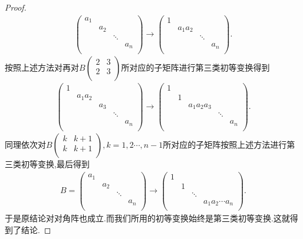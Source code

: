 \documentclass[lang=cn,newtx,10pt,scheme=chinese]{elegantbook}
\begin{document}
\begin{proof}
\begin{align*}
\left( \begin{matrix}
a_1&		&		&		\\
&		a_2&		&		\\
&		&		\ddots&		\\
&		&		&		a_n\\
\end{matrix} \right) \longrightarrow \left( \begin{matrix}
1&		&		&		\\
&		a_1a_2&		&		\\
&		&		\ddots&		\\
&		&		&		a_n\\
\end{matrix} \right) .
\end{align*}
按照上述方法对再对$B\left( \begin{matrix}
2&		3\\
2&		3\\
\end{matrix} \right) $所对应的子矩阵进行第三类初等变换得到
\begin{align*}
\left( \begin{matrix}
1&		&		&		&		\\
&		a_1a_2&		&		&		\\
&		&		a_3&		&		\\
&		&		&		\ddots&		\\
&		&		&		&		a_n\\
\end{matrix} \right) \longrightarrow \left( \begin{matrix}
1&		&		&		&		\\
&		1&		&		&		\\
&		&		a_1a_2a_3&		&		\\
&		&		&		\ddots&		\\
&		&		&		&		a_n\\
\end{matrix} \right) .
\end{align*}
同理依次对$B\left( \begin{matrix}
k&		k+1\\
k&		k+1\\
\end{matrix} \right),k=1,2\cdots,n-1$所对应的子矩阵按照上述方法进行第三类初等变换,最后得到
\begin{align*}
B=\left( \begin{matrix}
a_1&		&		&		\\
&		a_2&		&		\\
&		&		\ddots&		\\
&		&		&		a_n\\
\end{matrix} \right) \longrightarrow \left( \begin{matrix}
1&		&		&		\\
&		1&		&		\\
&		&		\ddots&		\\
&		&		&		a_1a_2\cdots a_n\\
\end{matrix} \right) .
\end{align*}
于是原结论对对角阵也成立.而我们所用的初等变换始终是第三类初等变换.这就得到了结论.
\end{proof}
\end{document}
